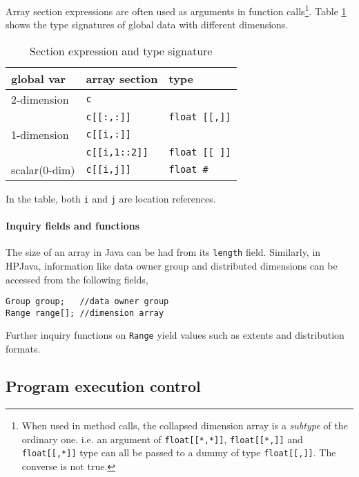 Array section expressions are often used as arguments in function
calls\footnote{When used in method calls, the collapsed dimension
array is a \emph{subtype} of the ordinary one. i.e. an argument of
\texttt{float[[*,*]]}, \texttt{float[[*,]]} and \texttt{float[[,*]]}
type can all be passed to a dummy of type \texttt{float[[,]]}.
The converse is not true.}.  Table \ref{tab:section} shows the type
signatures of global data with different dimensions.
\begin{table}[htbp]
  \begin{center}
    \leavevmode
    \small
    \begin{tabular}[c]{l|ll} 
      \textbf{global var}& \textbf{array section} & \textbf{type} \\ 
      \hline
      2-dimension & \texttt{c} & \\
      & \texttt{c[[:,:]]} & \texttt{float [[,]]} \\ 
      \hline
      1-dimension & \texttt{c[[i,:]]} & \\
      & \texttt{c[[i,1::2]]} & \texttt{float [[ ]]} \\ 
      \hline
      scalar(0-dim) & \texttt{c[[i,j]]} & \texttt{float \#} \\ 
      \hline
    \end{tabular}
    \normalsize
    \caption{Section expression and type signature}
    \label{tab:section}
  \end{center}
\end{table}
In the table, both \texttt{i} and \texttt{j} are location
references.

\paragraph{Inquiry fields and functions}

The size of an array in Java can be had from its
\texttt{length} field.  Similarly, in HPJava, information like data
owner group and distributed dimensions can be accessed from the
following fields,
\small
\begin{verbatim}
Group group;   //data owner group
Range range[]; //dimension array
\end{verbatim}
\normalsize
Further inquiry functions on {\tt Range} yield values such as
extents and distribution formats.


\subsection{Program execution control}
\label{control}

